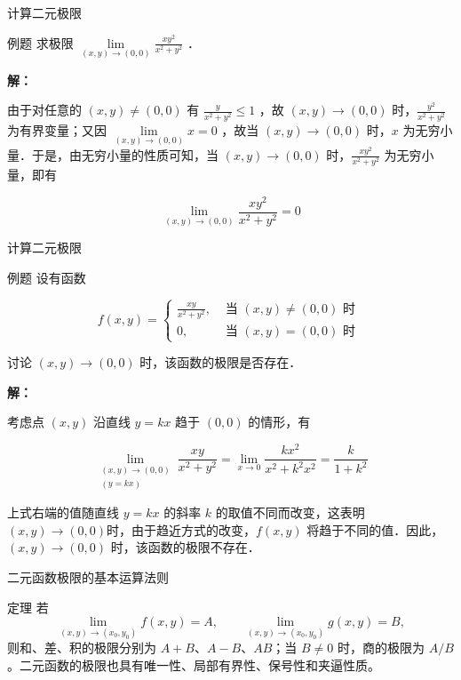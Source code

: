 \documentclass[aspectratio=169,10pt]{ctexbeamer}
\begin{document}
\begin{frame}{计算二元极限}
	\begin{block}{例题}
		求极限 $\lim\limits _{(x, y) \rightarrow(0,0)} \frac{x y^2}{x^2+y^2}$ ．
	\end{block}
	
	\pause
	
	\vspace{0.5cm}
	
	\textbf{解：}
	
	由于对任意的 $(x, y) \neq(0,0)$ 有 $\frac{y}{x^2+y^2} \leqslant 1$ ，故 $(x, y) \rightarrow(0,0)$ 时，$\frac{y^2}{x^2+y^2}$ 为有界变量；又因 $\lim\limits _{(x, y) \rightarrow(0,0)} x=0$ ，故当 $(x, y) \rightarrow(0,0)$ 时，$x$ 为无穷小量．于是，由无穷小量的性质可知，当 $(x, y) \rightarrow(0,0)$ 时，$\frac{x y^2}{x^2+y^2}$ 为无穷小量，即有
	
	$$
	\lim\limits _{(x, y) \rightarrow(0,0)} \frac{x y^2}{x^2+y^2}=0
	$$
\end{frame}

\begin{frame}{计算二元极限}
	\small
	\begin{block}{例题}
		设有函数
		
		$$
		f(x, y)= \begin{cases}\frac{x y}{x^2+y^2}, & \text { 当 }(x, y) \neq(0,0) \text { 时 } \\ 0, & \text { 当 }(x, y)=(0,0) \text { 时 }\end{cases}
		$$
		
		讨论 $(x, y) \rightarrow(0,0)$ 时，该函数的极限是否存在．
	
	\end{block}
	
	\pause
	
	
	\textbf{解：}
	
	考虑点 $(x, y)$ 沿直线 $y=k x$ 趋于 $(0,0)$ 的情形，有
	
	$$
	\lim\limits _{\substack{(x, y) \rightarrow(0,0) \\(y=kx)}} \frac{x y}{x^2+y^2}=\lim\limits _{x \rightarrow 0} \frac{k x^2}{x^2+k^2 x^2}=\frac{k}{1+k^2}
	$$
	
	上式右端的值随直线 $y=k x$ 的斜率 $k$ 的取值不同而改变，这表明 $(x, y) \rightarrow(0,0)$时，由于趋近方式的改变，$f(x, y)$ 将趋于不同的值．因此，$(x, y) \rightarrow(0,0)$ 时，该函数的极限不存在．
	
\end{frame}

\begin{frame}{二元函数极限的基本运算法则}
	\large
	\begin{block}{定理}
		若
		\[
		\lim\limits_{(x,y)\to(x_0,y_0)}f(x,y)=A,\qquad
		\lim\limits_{(x,y)\to(x_0,y_0)}g(x,y)=B,
		\]
		则和、差、积的极限分别为 \(A+B\)、\(A-B\)、\(AB\)；当 \(B\neq0\) 时，商的极限为 \(A/B\)。二元函数的极限也具有唯一性、局部有界性、保号性和夹逼性质。
	\end{block}
\end{frame}
\end{document}
